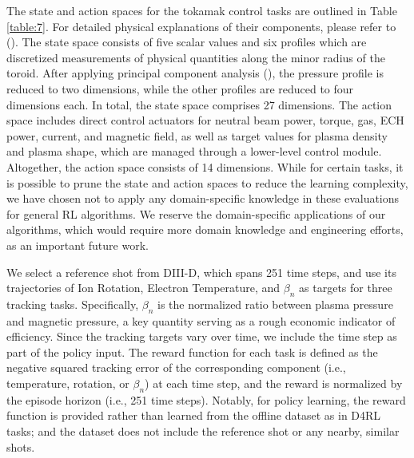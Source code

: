 The state and action spaces for the tokamak control tasks are outlined in Table \ref{table:7}. For detailed physical explanations of their components, please refer to (\cite{abbate2021data, DBLP:conf/l4dc/CharABBCCEMRKS23, ariola2008magnetic}). The state space consists of five scalar values and six profiles which are discretized measurements of physical quantities along the minor radius of the toroid. After applying principal component analysis (\cite{mackiewicz1993principal}), the pressure profile is reduced to two dimensions, while the other profiles are reduced to four dimensions each. In total, the state space comprises 27 dimensions. The action space includes direct control actuators for neutral beam power, torque, gas, ECH power, current, and magnetic field, as well as target values for plasma density and plasma shape, which are managed through a lower-level control module. Altogether, the action space consists of 14 dimensions. While for certain tasks, it is possible to prune the state and action spaces to reduce the learning complexity, we have chosen not to apply any domain-specific knowledge in these evaluations for general RL algorithms. We reserve the domain-specific applications of our algorithms, which would require more domain knowledge and engineering efforts, as an important future work.

We select a reference shot from DIII-D, which spans 251 time steps, and use its trajectories of Ion Rotation, Electron Temperature, and $\beta_n$ as targets for three tracking tasks. Specifically, $\beta_n$ is the normalized ratio between plasma pressure and magnetic pressure, a key quantity serving as a rough economic indicator of efficiency. Since the tracking targets vary over time, we include the time step as part of the policy input. The reward function for each task is defined as the negative squared tracking error of the corresponding component (i.e., temperature, rotation, or $\beta_n$) at each time step, and the reward is normalized by the episode horizon (i.e., 251 time steps). Notably, for policy learning, the reward function is provided rather than learned from the offline dataset as in D4RL tasks; and the dataset does not include the reference shot or any nearby, similar shots.







